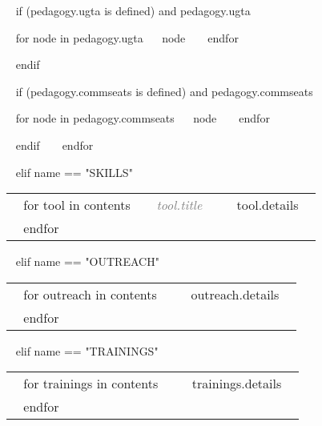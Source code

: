 \begin{minipage}{\textwidth}
  ~{ if (pedagogy.ugta is defined) and pedagogy.ugta }~
  \begin{entrylist}[.1]
    ~{ for node in pedagogy.ugta}~
     \pedentry
      {~{{ node }}~}
    ~{ endfor }~
  \end{entrylist}
  ~{ endif }~

  ~{ if (pedagogy.commseats is defined) and pedagogy.commseats }~
  \begin{entrylist}[.1]
    ~{ for node in pedagogy.commseats}~
     \pedentry
      {~{{ node }}~}
    ~{ endfor }~
  \end{entrylist}
  ~{ endif }~
~{ endfor }~



~{ elif name == "SKILLS" }~

\begin{tabular}{ @{} p{32mm} p{135mm} @{} }
  ~{ for tool in contents }~
  \small \textcolor{gray}{{\emph{~{{ tool.title }}~}}} & {\small ~{{ tool.details }}~} \\
  ~{ endfor }~
\end{tabular}


~{ elif name == "OUTREACH" }~

\begin{tabular}{ @{} p{32mm} p{135mm} @{} }
  ~{ for outreach in contents }~
  \small \textcolor{gray}{{\emph{ }}} & {\small ~{{ outreach.details }}~} \\
  ~{ endfor }~
\end{tabular}


~{ elif name == "TRAININGS" }~

\begin{tabular}{ @{} p{32mm} p{135mm} @{} }
  ~{ for trainings in contents }~
  \small \textcolor{gray}{{\emph{ }}} & {\small ~{{ trainings.details }}~} \\
  ~{ endfor }~
\end{tabular}


\end{minipage}
